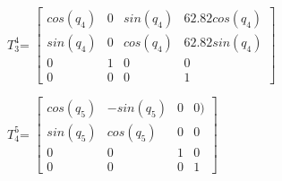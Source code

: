 \begin{center}
\vspace{1cm}				

$T_3^4 $= 	\begin{math}
				\left[
				\begin{array}{cccc}
			   	cos(q_4)&               0&         sin(q_4)& 62.82cos(q_4)\\
         sin(q_4)&               0&         cos(q_4)& 62.82sin(q_4)\\
               0&               1&               0&            0 \\
               0&               0&               0&            1

				\end{array}
				\right]
				\end{math}\\			

\vspace{1cm}

$T_4^5 $= 	\begin{math}
				\left[
				\begin{array}{cccc}
			   	cos(q_5)&	  		 -sin(q_5)&								0&			0)\\
          sin(q_5)&          cos(q_5)&                0& 		 0\\
                0&                0&                1&      0\\
                0&                0&                0&      1

				\end{array}
				\right]
				\end{math}\\
				
				\newpage
				
			
			

\end{center}
